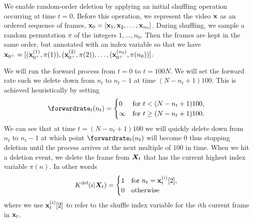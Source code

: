 We enable random-order deletion by applying an initial shuffling operation occurring at time $t=0$. Before this operation, we represent the video ${\mathbf{x}}$ as an ordered sequence of frames, ${\mathbf{x}}_0=[{\mathbf{x}}_1,{\mathbf{x}}_2,\ldots,{\mathbf{x}}_{n_0}]$. During shuffling, we sample a random permutation $\pi$ of the integers $1,\ldots,n_0$. Then the frames are kept in the same order, but annotated with an index variable so that we have ${\mathbf{x}}_{0^+}=[({\mathbf{x}}_{0^+}^{(1)}, \pi(1)), ({\mathbf{x}}_{0^+}^{(2)}, \pi(2)), \ldots, ({\mathbf{x}}^{(n_0)}_{0^+}, \pi(n_0))]$.

We will run the forward process from $t=0$ to $t = 100N$. We will set the forward rate such we delete down from $n_t$ to $n_t - 1$ at time $(N-n_t+1)100$. This is achieved heuristically by setting
\begin{equation}
    \forwardrate_t(n_t) = \begin{cases}
        0 & \text{for } t < (N-n_t+1)100, \\
        \infty & \text{for }  t \geq (N-n_t + 1) 100.
    \end{cases} 
\end{equation}
We can see that at time $t = (N - n_t + 1)100$ we will quickly delete down from $n_t$ to $n_t-1$ at which point $\forwardrate_t(n_t)$ will become $0$ thus stopping deletion until the process arrives at the next multiple of $100$ in time. When we hit a deletion event, we delete the frame from ${\bm{X}}_t$ that has the current highest index variable $\pi(n)$. In other words
\begin{equation}
    K^{\textup{del}}(i | {\bm{X}}_t) = \begin{cases}
        1 & \text{for } n_t = {\mathbf{x}}_{t}^{(i)}[2], \\
        0 & \text{otherwise}
    \end{cases}    
\end{equation}
where we use ${\mathbf{x}}_{t}^{(i)}[2]$ to refer to the shuffle index variable for the $i$th current frame in ${\mathbf{x}}_{t}$.


